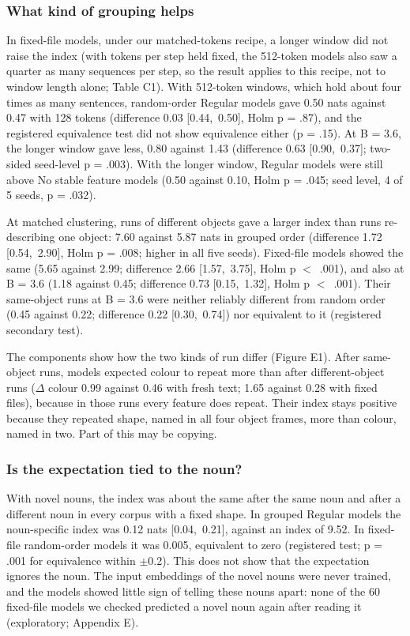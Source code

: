 \subsubsection*{What kind of grouping helps}
In fixed-file models, under our matched-tokens recipe, a longer window did not raise the index (with tokens per step held fixed, the 512-token models also saw a quarter as many sequences per step, so the result applies to this recipe, not to window length alone; Table C1). With 512-token windows, which hold about four times as many sentences, random-order Regular models gave 0.50 nats against 0.47 with 128 tokens (difference 0.03 [\textminus{}0.44,~0.50], Holm p = .87), and the registered equivalence test did not show equivalence either (p = .15). At B = 3.6, the longer window gave less, 0.80 against 1.43 (difference \textminus{}0.63 [\textminus{}0.90,~\textminus{}0.37]; two-sided seed-level p = .003). With the longer window, Regular models were still above No stable feature models (0.50 against 0.10, Holm p = .045; seed level, 4 of 5 seeds, p = .032).

At matched clustering, runs of different objects gave a larger index than runs re-describing one object: 7.60 against 5.87 nats in grouped order (difference 1.72 [0.54,~2.90], Holm p = .008; higher in all five seeds). Fixed-file models showed the same (5.65 against 2.99; difference 2.66 [1.57,~3.75], Holm p $<$~.001), and also at B = 3.6 (1.18 against 0.45; difference 0.73 [0.15,~1.32], Holm p $<$~.001). Their same-object runs at B = 3.6 were neither reliably different from random order (0.45 against 0.22; difference 0.22 [\textminus{}0.30,~0.74]) nor equivalent to it (registered secondary test).

The components show how the two kinds of run differ (Figure E1). After same-object runs, models expected colour to repeat more than after different-object runs ($\Delta$ colour 0.99 against 0.46 with fresh text; 1.65 against \textminus{}0.28 with fixed files), because in those runs every feature does repeat. Their index stays positive because they repeated shape, named in all four object frames, more than colour, named in two. Part of this may be copying.

\subsubsection*{Is the expectation tied to the noun?\nohdpunct}
With novel nouns, the index was about the same after the same noun and after a different noun in every corpus with a fixed shape. In grouped Regular models the noun-specific index was 0.12 nats [0.04,~0.21], against an index of 9.52. In fixed-file random-order models it was 0.005, equivalent to zero (registered test; p = .001 for equivalence within $\pm$0.2). This does not show that the expectation ignores the noun. The input embeddings of the novel nouns were never trained, and the models showed little sign of telling these nouns apart: none of the 60 fixed-file models we checked predicted a novel noun again after reading it (exploratory; Appendix E).

